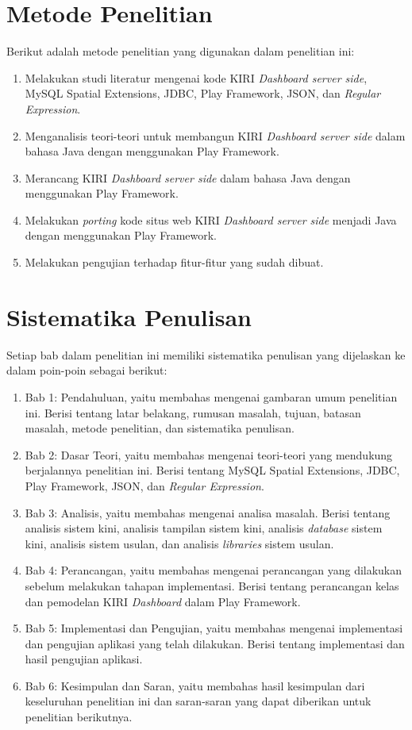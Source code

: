 \section{Metode Penelitian}
\label{sec:metode_penelitian}
Berikut adalah metode penelitian yang digunakan dalam penelitian ini:
	\begin{enumerate}
		\item Melakukan studi literatur mengenai kode KIRI \textit{Dashboard server side}, MySQL Spatial Extensions, JDBC, Play Framework, JSON, dan \textit{Regular Expression}.
		\item Menganalisis teori-teori untuk membangun KIRI \textit{Dashboard server side} dalam bahasa Java dengan menggunakan Play Framework.
		\item Merancang KIRI \textit{Dashboard server side} dalam bahasa Java dengan menggunakan Play Framework.
		\item Melakukan \textit{porting} kode situs web KIRI \textit{Dashboard server side} menjadi Java dengan menggunakan Play Framework.
		\item Melakukan pengujian terhadap fitur-fitur yang sudah dibuat.
	\end{enumerate}

\section{Sistematika Penulisan}
\label{sec:sistematika_penulisan}
Setiap bab dalam penelitian ini memiliki sistematika penulisan yang dijelaskan ke dalam poin-poin sebagai berikut:
	\begin{enumerate}
		\item Bab 1: Pendahuluan, yaitu membahas mengenai gambaran umum penelitian ini. Berisi tentang latar belakang, rumusan masalah, tujuan, batasan masalah, metode penelitian, dan sistematika penulisan.
		\item Bab 2: Dasar Teori, yaitu membahas mengenai teori-teori yang mendukung berjalannya penelitian ini. Berisi tentang MySQL Spatial Extensions, JDBC, Play Framework, JSON, dan \textit{Regular Expression}.
		\item Bab 3: Analisis, yaitu membahas mengenai analisa masalah. Berisi tentang analisis sistem kini, analisis tampilan sistem kini, analisis \textit{database} sistem kini, analisis sistem usulan, dan analisis \textit{libraries} sistem usulan.
		\item Bab 4: Perancangan, yaitu membahas mengenai perancangan yang dilakukan sebelum melakukan tahapan implementasi. Berisi tentang perancangan kelas dan pemodelan KIRI \textit{Dashboard} dalam Play Framework.
		\item Bab 5: Implementasi dan Pengujian, yaitu membahas mengenai implementasi dan pengujian aplikasi yang telah dilakukan. Berisi tentang implementasi dan hasil pengujian aplikasi.
		\item Bab 6: Kesimpulan dan Saran, yaitu membahas hasil kesimpulan dari keseluruhan penelitian ini dan saran-saran yang dapat diberikan untuk penelitian berikutnya.
	\end{enumerate}